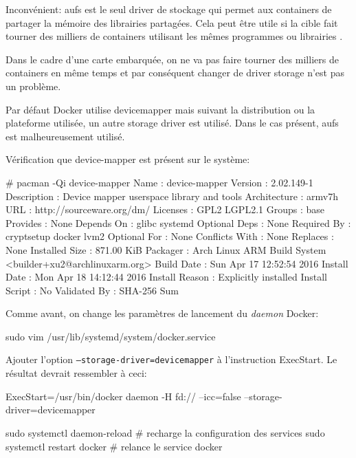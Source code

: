 \documentclass[11pt,a4paper,oneside]{report}
\newcommand{\code}[1]{\texttt{#1}}
\begin{document}
Inconvénient: aufs est le seul driver de stockage qui permet aux containers de partager la mémoire des librairies partagées. Cela peut être utile si la cible fait tourner des milliers de containers utilisant les mêmes programmes ou librairies \cite{cis_benchmark}.

Dans le cadre d'une carte embarquée, on ne va pas faire tourner des milliers de containers en même temps et par conséquent changer de driver storage n'est pas un problème.

Par défaut Docker utilise devicemapper mais suivant la distribution ou la plateforme utilisée, un autre storage driver est utilisé. Dans le cas présent, aufs est malheureusement utilisé.

Vérification que device-mapper est présent sur le système:

\begin{bashcode}
# pacman -Qi device-mapper
Name            : device-mapper
Version         : 2.02.149-1
Description     : Device mapper userspace library and tools
Architecture    : armv7h
URL             : http://sourceware.org/dm/
Licenses        : GPL2  LGPL2.1
Groups          : base
Provides        : None
Depends On      : glibc  systemd
Optional Deps   : None
Required By     : cryptsetup  docker  lvm2
Optional For    : None
Conflicts With  : None
Replaces        : None
Installed Size  : 871.00 KiB
Packager        : Arch Linux ARM Build System <builder+xu2@archlinuxarm.org>
Build Date      : Sun Apr 17 12:52:54 2016
Install Date    : Mon Apr 18 14:12:44 2016
Install Reason  : Explicitly installed
Install Script  : No
Validated By    : SHA-256 Sum
\end{bashcode}

Comme avant, on change les paramètres de lancement du \textit{daemon} Docker:

\begin{bashcode}
sudo vim /usr/lib/systemd/system/docker.service
\end{bashcode}

Ajouter l'option \code{--storage-driver=devicemapper} à l'instruction ExecStart. Le résultat devrait ressembler à ceci:

\begin{bashcode}
ExecStart=/usr/bin/docker daemon -H fd:// --icc=false --storage-driver=devicemapper
\end{bashcode}

\begin{bashcode}
sudo systemctl daemon-reload # recharge la configuration des services
sudo systemctl restart docker # relance le service docker
\end{bashcode}
\end{document}
